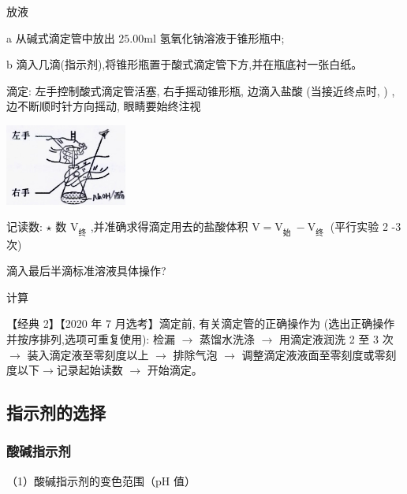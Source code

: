 \documentclass[10pt,cn]{elegantbook}
\begin{document}
	
	 放液
	
	a 从碱式滴定管中放出 \({25.00}\mathrm{{ml}}\) 氢氧化钠溶液于锥形瓶中;
	
	
	
	\(\mathrm{b}\) 滴入几滴(指示剂),将锥形瓶置于酸式滴定管下方,并在瓶底衬一张白纸。
	
		滴定: 左手控制酸式滴定管活塞, 右手摇动锥形瓶, 边滴入盐酸 (当接近终点时, ) , 边不断顺时针方向摇动, 眼睛要始终注视
	
	\begin{center}
		\includegraphics[max width=0.3\textwidth]{image/c4-2.jpg}
	\end{center}
	
	记读数: $\star$ 数 \({\mathrm{V}}_{\text{终}}\) ,并准确求得滴定用去的盐酸体积 \(\mathrm{V} = {\mathrm{V}}_{\text{始 }} - {\mathrm{V}}_{\text{终 }}\) (平行实验 2 -3 次) 
	
	滴入最后半滴标准溶液具体操作?
	
	计算
	
	【经典 2】【2020 年 7 月选考】滴定前, 有关滴定管的正确操作为 (选出正确操作并按序排列,选项可重复使用): 检漏 \(\rightarrow\) 蒸馏水洗涤 \(\rightarrow\) 用滴定液润洗 2 至 3 次 \(\rightarrow\) 装入滴定液至零刻度以上 \(\rightarrow\) 排除气泡 \(\rightarrow\) 调整滴定液液面至零刻度或零刻度以下\( \rightarrow \)记录起始读数 \(\rightarrow\) 开始滴定。
	
	
\subsection{指示剂的选择}

\subsubsection{酸碱指示剂}

（1）酸碱指示剂的变色范围（pH 值） 

\begin{center}
\end{center}
\end{document}
